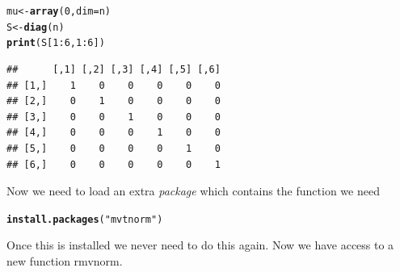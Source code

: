 \documentclass[a4paper,11pt]{article}\usepackage[]{graphicx}\usepackage[]{color}
\makeatletter
\newcommand{\hlnum}[1]{\textcolor[rgb]{0.686,0.059,0.569}{#1}}%
\newcommand{\hlstr}[1]{\textcolor[rgb]{0.192,0.494,0.8}{#1}}%
\newcommand{\hlopt}[1]{\textcolor[rgb]{0,0,0}{#1}}%
\newcommand{\hlstd}[1]{\textcolor[rgb]{0.345,0.345,0.345}{#1}}%
\newcommand{\hlkwb}[1]{\textcolor[rgb]{0.69,0.353,0.396}{#1}}%
\newcommand{\hlkwc}[1]{\textcolor[rgb]{0.333,0.667,0.333}{#1}}%
\newcommand{\hlkwd}[1]{\textcolor[rgb]{0.737,0.353,0.396}{\textbf{#1}}}%
\newenvironment{kframe}{%
 \def\at@end@of@kframe{}%
 \ifinner\ifhmode%
  \def\at@end@of@kframe{\end{minipage}}%
  \begin{minipage}{\columnwidth}%
 \fi\fi%
 \def\FrameCommand##1{\hskip\@totalleftmargin \hskip-\fboxsep
 \colorbox{shadecolor}{##1}\hskip-\fboxsep
     \hskip-\linewidth \hskip-\@totalleftmargin \hskip\columnwidth}%
 \MakeFramed {\advance\hsize-\width
   \@totalleftmargin\z@ \linewidth\hsize
   \@setminipage}}%
 {\par\unskip\endMakeFramed%
 \at@end@of@kframe}
\newenvironment{knitrout}{}{} %
\makeatother
\begin{document}
\begin{knitrout}
\color{fgcolor}\begin{kframe}
\begin{alltt}
  \hlstd{mu} \hlkwb{<-} \hlkwd{array}\hlstd{(}\hlnum{0}\hlstd{,} \hlkwc{dim} \hlstd{= n)}
  \hlstd{S} \hlkwb{<-} \hlkwd{diag}\hlstd{(n)}
  \hlkwd{print}\hlstd{(S[}\hlnum{1}\hlopt{:}\hlnum{6}\hlstd{,} \hlnum{1}\hlopt{:}\hlnum{6}\hlstd{])}
\end{alltt}
\begin{verbatim}
##      [,1] [,2] [,3] [,4] [,5] [,6]
## [1,]    1    0    0    0    0    0
## [2,]    0    1    0    0    0    0
## [3,]    0    0    1    0    0    0
## [4,]    0    0    0    1    0    0
## [5,]    0    0    0    0    1    0
## [6,]    0    0    0    0    0    1
\end{verbatim}
\end{kframe}
\end{knitrout}

Now we need to load an extra \emph{package} which contains the function we need

\begin{knitrout}
\color{fgcolor}\begin{kframe}
\begin{alltt}
  \hlkwd{install.packages}\hlstd{(}\hlstr{"mvtnorm"}\hlstd{)}
\end{alltt}
\end{kframe}
\end{knitrout}

Once this is installed we never need to do this again. 
Now we have access to a new function rmvnorm.
\end{document}
